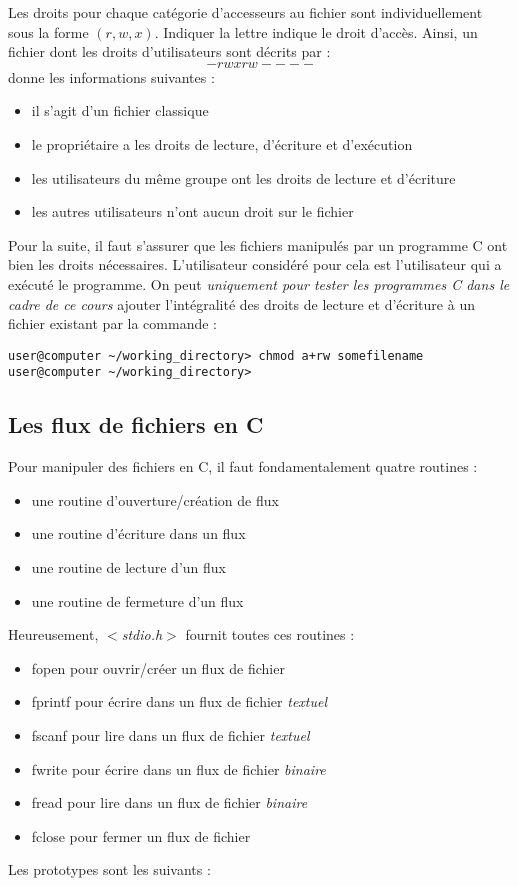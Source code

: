 \documentclass[../../../main.tex]{subfiles}
\begin{document}
Les droits pour chaque catégorie d'accesseurs au fichier sont individuellement sous la forme $(r, w, x)$. Indiquer la lettre indique le droit d'accès. Ainsi, un fichier dont les droits d'utilisateurs sont décrits par :
$$-rwxrw----$$
donne les informations suivantes :
\begin{itemize}
	\item il s'agit d'un fichier classique
	\item le propriétaire a les droits de lecture, d'écriture et d'exécution
	\item les utilisateurs du même groupe ont les droits de lecture et d'écriture
	\item les autres utilisateurs n'ont aucun droit sur le fichier
\end{itemize}
Pour la suite, il faut s'assurer que les fichiers manipulés par un programme C ont bien les droits nécessaires. L'utilisateur considéré pour cela est l'utilisateur qui a exécuté le programme. On peut \textit{uniquement pour tester les programmes C dans le cadre de ce cours} ajouter l'intégralité des droits de lecture et d'écriture à un fichier existant par la commande :
\begin{verbatim}
user@computer ~/working_directory> chmod a+rw somefilename
user@computer ~/working_directory>
\end{verbatim}
\subsection{Les flux de fichiers en C}
Pour manipuler des fichiers en C, il faut fondamentalement quatre routines :
\begin{itemize}
	\item une routine d'ouverture/création de flux
	\item une routine d'écriture dans un flux
	\item une routine de lecture d'un flux
	\item une routine de fermeture d'un flux
\end{itemize}
Heureusement, \textit{$<$stdio.h$>$} fournit toutes ces routines :
\begin{itemize}
	\item \textsf{fopen} pour ouvrir/créer un flux de fichier
	\item \textsf{fprintf} pour écrire dans un flux de fichier \textit{textuel}
	\item \textsf{fscanf} pour lire dans un flux de fichier \textit{textuel}
	\item \textsf{fwrite} pour écrire dans un flux de fichier \textit{binaire}
	\item \textsf{fread} pour lire dans un flux de fichier \textit{binaire}
	\item \textsf{fclose} pour fermer un flux de fichier
\end{itemize}
Les prototypes sont les suivants :
\end{document}
